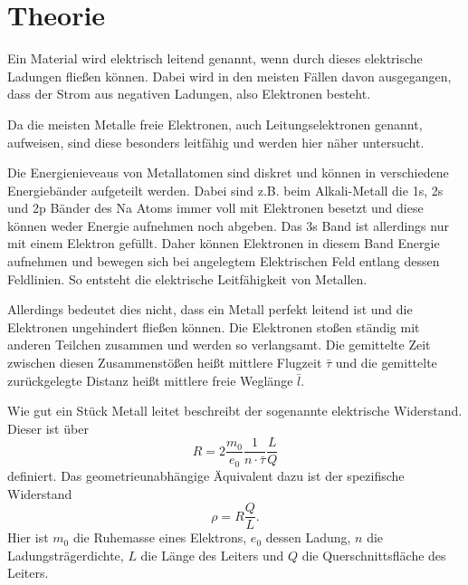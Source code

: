 \section{Theorie}
\label{sec:Theorie}






Ein Material wird elektrisch leitend genannt, wenn durch dieses elektrische Ladungen fließen können.
Dabei wird in den meisten Fällen davon ausgegangen, dass der Strom aus negativen Ladungen, also Elektronen besteht.

Da die meisten Metalle freie Elektronen, auch Leitungselektronen genannt, aufweisen, sind diese besonders leitfähig und werden hier näher untersucht.

Die Energienieveaus von Metallatomen sind diskret und können in verschiedene Energiebänder aufgeteilt werden. 
Dabei sind z.B. beim Alkali-Metall die 1s, 2s und 2p Bänder des Na Atoms immer voll mit Elektronen besetzt und diese können weder Energie aufnehmen noch abgeben.
Das 3s Band ist allerdings nur mit einem Elektron gefüllt. 
Daher können Elektronen in diesem Band Energie aufnehmen und bewegen sich bei angelegtem Elektrischen Feld entlang dessen Feldlinien.
So entsteht die elektrische Leitfähigkeit von Metallen. \cite{V311}

Allerdings bedeutet dies nicht, dass ein Metall perfekt leitend ist und die Elektronen ungehindert fließen können.
Die Elektronen stoßen ständig mit anderen Teilchen zusammen und werden so verlangsamt.
Die gemittelte Zeit zwischen diesen Zusammenstößen heißt mittlere Flugzeit $\bar{\tau}$ und die gemittelte zurückgelegte Distanz heißt mittlere freie Weglänge $\bar{l}$.

Wie gut ein Stück Metall leitet beschreibt der sogenannte elektrische Widerstand.
Dieser ist über 
\begin{equation}
    R = 2\frac{m_0}{e_0}\frac{1}{n \cdot \bar{\tau}}\frac{L}{Q}
    \label{eq:widerstand}
\end{equation}
definiert.
Das geometrieunabhängige Äquivalent dazu ist der spezifische Widerstand
\begin{equation}
    \rho = R\frac{Q}{L}.
    \label{eq:spezwiderstand}
\end{equation}
Hier ist $m_0$ die Ruhemasse eines Elektrons, $e_0$ dessen Ladung, $n$ die Ladungsträgerdichte, $L$ die Länge des Leiters und $Q$ die Querschnittsfläche des Leiters. \cite{V311}

